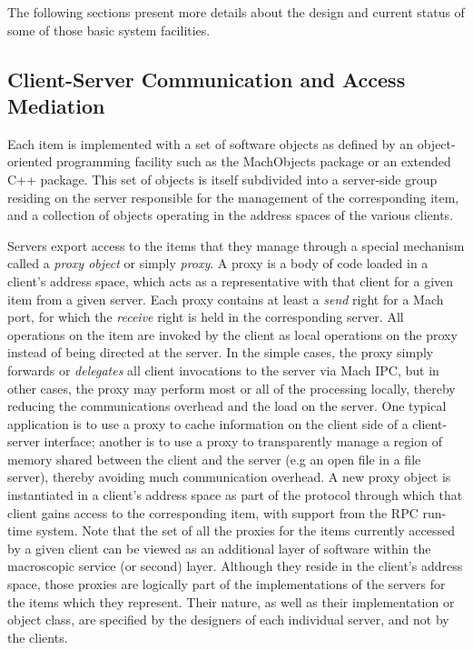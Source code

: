 The following sections present more details about the design and
current status of some of those basic system facilities.


\subsection{Client-Server Communication and Access Mediation}

Each item is implemented with a set of software objects as defined by
an object-oriented programming facility such as the MachObjects
package\cite{MACHOBJ} or an extended C++ package\cite{GUEDES}.  This
set of objects is itself subdivided into a server-side group residing
on the server responsible for the management of the corresponding
item, and a collection of objects operating in the address spaces of
the various clients.

Servers export access to the items that they manage through a special
mechanism called a {\em proxy object} or simply {\em
proxy}\cite{SHAPIRO86}.  A proxy is a body of code loaded in a
client's address space, which acts as a representative with that
client for a given item from a given server.  Each proxy contains at
least a {\em send} right for a Mach port, for which the {\em receive}
right is held in the corresponding server.  All operations on the item
are invoked by the client as local operations on the proxy instead of
being directed at the server.  In the simple cases, the proxy simply
forwards or {\em delegates} all client invocations to the server via
Mach IPC, but in other cases, the proxy may perform most or all of the
processing locally, thereby reducing the communications overhead and
the load on the server. One typical application is to use a proxy to
cache information on the client side of a client-server interface;
another is to use a proxy to transparently manage a region of memory
shared between the client and the server (e.g an open file in a file
server), thereby avoiding much communication overhead.  A new proxy
object is instantiated in a client's address space as part of the
protocol through which that client gains access to the corresponding
item, with support from the RPC run-time system.  Note that the set of
all the proxies for the items currently accessed by a given client can
be viewed as an additional layer of software within the macroscopic
service (or second) layer.  Although they reside in the client's
address space, those proxies are logically part of the implementations
of the servers for the items which they represent.  Their nature, as
well as their implementation or object class, are specified by the
designers of each individual server, and not by the clients.


